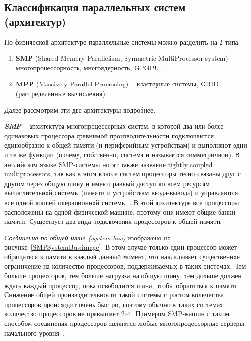 \subsection{Классификация параллельных систем (архитектур)}

По физической архитектуре параллельные системы можно разделить на 2 типа:

\begin{enumerate}
    \item\textbf{SMP} (Shared Memory Parallelism, Symmetric MultiProcessor system) – многопроцессорность, многоядерность, GPGPU\@. 
    \item\textbf{MPP} (Massively Parallel Processing) – кластерные системы, GRID (распределенные вычисления).
\end{enumerate}

Далее рассмотрим эти две архитектуры подробнее.

\textbf{\textit{SMP}} -- архитектура многопроцессорных систем, в которой два или более одинаковых процессора сравнимой производительности подключаются единообразно к общей памяти (и периферийным устройствам) и выполняют одни и те же функции (почему, собственно, система и называется симметричной). В английском языке SMP-системы носят также название tightly coupled multiprocessors, так как в этом классе систем процессоры тесно связаны друг с другом через общую шину и имеют равный доступ ко всем ресурсам вычислительной системы (памяти и устройствам ввода-вывода) и управляются все одной копией операционной системы~\cite{SymmetricMultiprocessingWP}. В этой архитектуре все процессоры расположены на одной физической машине, поэтому они имеют общие банки памяти. Существует два вида подключения процессоров к общей памяти.

\textit{Соединение по общей шине (system bus)} изображено на рисунке~\ref{SMPSystemBus:image}. В этом случае только один процессор может обращаться к памяти в каждый данный момент, что накладывает существенное ограничение на количество процессоров, поддерживаемых в таких системах. Чем больше процессоров, тем больше нагрузка на общую шину, тем дольше должен ждать каждый процессор, пока освободится шина, чтобы обратиться к памяти. Снижение общей производительности такой системы с ростом количества процессоров происходит очень быстро, поэтому обычно в таких системах количество процессоров не превышает 2--4. Примером SMP-машин с таким способом соединения процессоров являются любые многопроцессорные серверы начального уровня~\cite{Martyshkin2014}.

